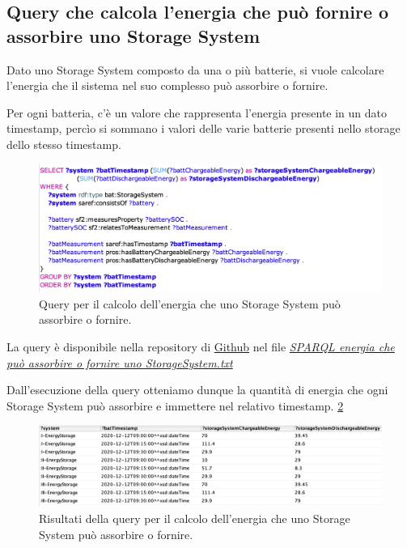 \subsection{Query che calcola l'energia che può fornire o assorbire uno Storage System} \label{subquery}

Dato uno Storage System composto da una o più batterie, si vuole calcolare l'energia che il sistema nel suo complesso può assorbire o fornire.

Per ogni batteria, c'è un valore che rappresenta l'energia presente in un dato timestamp, percìo si sommano i valori delle varie batterie presenti nello storage dello stesso timestamp.

\begin{figure}[H]
    \centering
    \includegraphics[width=15cm]{images/subquery.png}
    \caption{Query per il calcolo dell'energia che uno Storage System può assorbire o fornire.}
    \label{fig:subquery}
\end{figure}

La query è disponibile nella repository di \href{https://github.com/19eddie/SemanticWeb-Assignment02-03}{Github} nel file \href{https://github.com/19eddie/SemanticWeb-Assignment02-03/blob/main/SPARQL%20energia%20che%20pu%C3%B2%20assorbire%20o%20fornire%20uno%20StorageSystem.txt}{\textit{SPARQL energia che può assorbire o fornire uno StorageSystem.txt}}

Dall'esecuzione della query otteniamo dunque la quantità di energia che ogni Storage System può assorbire e immettere nel relativo timestamp. \ref{fig:subquery_res}

\begin{figure}[H]
    \centering
    \includegraphics[width=15cm]{images/subquery_res.png}
    \caption{Risultati della query per il calcolo dell'energia che uno Storage System può assorbire o fornire.}
    \label{fig:subquery_res}
\end{figure}

